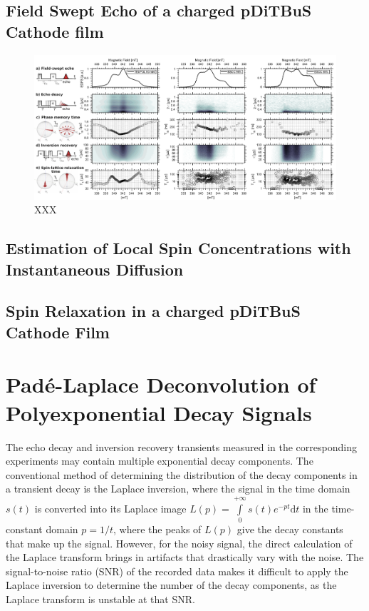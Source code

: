 \subsection{Field Swept Echo of a charged pDiTBuS Cathode film}
\begin{figure}[h]
\center
	\includegraphics[width=1\textwidth]{./pulse/figures/FSE_DTBS_FSE_RELAX_T1Tm.pdf}
	\caption{XXX}
	\label{fig:Figure_FSE1}
\end{figure}


\subsection{Estimation of Local Spin Concentrations with Instantaneous Diffusion}
\subsection{Spin Relaxation in a charged pDiTBuS Cathode Film}

\section{Pad{\'e}-Laplace Deconvolution of Polyexponential Decay Signals}
\label{sec:pade-laplace}
The echo decay and inversion recovery transients measured in the corresponding experiments may contain multiple exponential decay components. The conventional method of determining the distribution of the decay components in a transient decay is the Laplace inversion, where the signal in the time domain $s(t)$ is converted into its Laplace image $L(p)=\int\limits_{0}^{+\infty}s(t)e^{-pt}\mathrm{d}t$ in the time-constant domain $p=1/t$, where the peaks of $L(p)$ give the decay constants that make up the signal. However, for the noisy signal, the direct calculation of the Laplace transform brings in artifacts that drastically vary with the noise. The signal-to-noise ratio (SNR) of the recorded data makes it difficult to apply the Laplace inversion to determine the number of the decay components, as the Laplace transform is unstable at that SNR. \\ 


